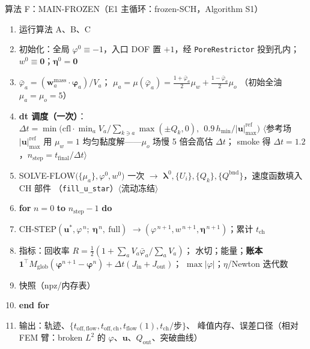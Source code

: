\documentclass[11pt]{article}
\newcommand{\code}[1]{\texttt{#1}}
\newcommand{\kwd}[1]{\textbf{#1}}
\newcommand{\cmt}[1]{{\color{cmtclr}$\langle$#1$\rangle$}}
\newcommand{\ind}{\hspace*{1.5em}}
\newenvironment{pseudo}[1]{\begin{algobox}{#1}%
  \begin{enumerate}[label={\ttfamily\arabic*}, leftmargin=3.4em, itemsep=1.5pt, topsep=1pt, parsep=0pt]}%
  {\end{enumerate}\end{algobox}}
\begin{document}
\begin{pseudo}{算法 F：MAIN-FROZEN（E1 主循环：frozen-SCH，Algorithm S1）}
\item 运行算法 A、B、C
\item 初始化：全局 $\varphi^0\equiv-1$，入口 DOF 置 $+1$，经 \code{PoreRestrictor} 投到孔内；
$w^0\equiv\bm 0$；$\bm\eta^0=\bm 0$
\item $\bar\varphi_a=(\bm w^{\mathrm{mass}}_a\!\cdot\!\bm\varphi_a)/V_a$；
$\mu_a=\mu(\bar\varphi_a)=\tfrac{1+\bar\varphi_a}{2}\mu_w+\tfrac{1-\bar\varphi_a}{2}\mu_o$
（初始全油 $\mu_a=\mu_o=5$）
\item \textbf{dt 调度（一次）}：
$\Delta t=\min\big(\mathrm{cfl}\cdot\min_aV_a\big/\textstyle\sum_{k\ni a}\max(\pm Q_k,0),\ \ 0.9\,h_{\min}/|\bm u|_{\max}^{\mathrm{ref}}\big)$
\cmt{参考场 $|\bm u|_{\max}^{\mathrm{ref}}$ 用 $\mu_w=1$ 均匀黏度解——$\mu_o$ 场慢 5 倍会高估 $\Delta t$；
smoke 得 $\Delta t=1.2$，$n_{\mathrm{step}}=t_{\mathrm{final}}/\Delta t$}
\item SOLVE-FLOW$\big(\{\mu_a\},\varphi^0,w^0\big)$ 一次
$\to$ $\bm\lambda^0,\{U_i\},\{Q_k\},\{Q^{\mathrm{bnd}}\}$，速度函数填入 CH 部件
（\code{fill\_u\_star}）\cmt{流动冻结}
\item \kwd{for} $n=0$ \kwd{to} $n_{\mathrm{step}}-1$ \kwd{do}
\item \ind CH-STEP$(\bm u^{*},\varphi^{\,n};\ \bm\eta^{\,n},\ \mathrm{full})$
$\to(\varphi^{\,n+1},w^{\,n+1},\bm\eta^{\,n+1})$；累计 $t_{\mathrm{ch}}$
\item \ind 指标：回收率 $R=\tfrac12(1+\sum_aV_a\bar\varphi_a/\sum_aV_a)$；
水切；能量；\textbf{账本}
$\bm 1^{\!\top}M_{\mathrm{glob}}(\bm\varphi^{n+1}-\bm\varphi^{n})+\Delta t(J_{\mathrm{in}}+J_{\mathrm{out}})$；
$\max|\varphi|$；$\eta$/Newton 迭代数
\item \ind 快照（npz/内存表）
\item \kwd{end for}
\item 输出：轨迹、$\{t_{\mathrm{off,flow}},t_{\mathrm{off,ch}},t_{\mathrm{flow}}(1),t_{\mathrm{ch}}/\text{步}\}$、
峰值内存、误差口径（相对 FEM 臂：broken $L^2$ 的 $\varphi$、$\bm u$、$Q_{\mathrm{out}}$、突破曲线）
\end{pseudo}
\end{document}
